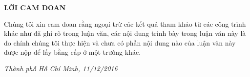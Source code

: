 \begin{titlepage}
\centering
	{\scshape\LARGE \textbf{LỜI CAM ĐOAN} \par}
	\vspace{1cm}
	
\justify
Chúng tôi xin cam đoan rằng ngoại trừ các kết quả tham khảo từ các công trình khác
như đã ghi rõ trong luận văn, các nội dung trình bày trong luận văn này là do chính chúng tôi
thực hiện và chưa có phần nội dung nào của luận văn này được nộp để lấy bằng cấp ở một
trường khác. \par

\begin{flushright}
\emph{Thành phố Hồ Chí Minh, 11/12/2016}
\end{flushright}


\vfill %
\end{titlepage}